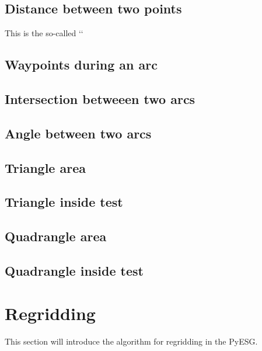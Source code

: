 \documentclass[letterpaper,10pt,english]{sphinxmanual}
\begin{document}
\section{Distance between two points}
\label{spherical_geometry:distance-between-two-points}
This is the so-called {}`{}`


\section{Waypoints during an arc}
\label{spherical_geometry:waypoints-during-an-arc}

\section{Intersection betweeen two arcs}
\label{spherical_geometry:intersection-betweeen-two-arcs}

\section{Angle between two arcs}
\label{spherical_geometry:angle-between-two-arcs}

\section{Triangle area}
\label{spherical_geometry:triangle-area}

\section{Triangle inside test}
\label{spherical_geometry:triangle-inside-test}

\section{Quadrangle area}
\label{spherical_geometry:quadrangle-area}

\section{Quadrangle inside test}
\label{spherical_geometry:quadrangle-inside-test}

\chapter{Regridding}
\label{regridding::doc}\label{regridding:regridding}
This section will introduce the algorithm for regridding in the PyESG.
\end{document}
